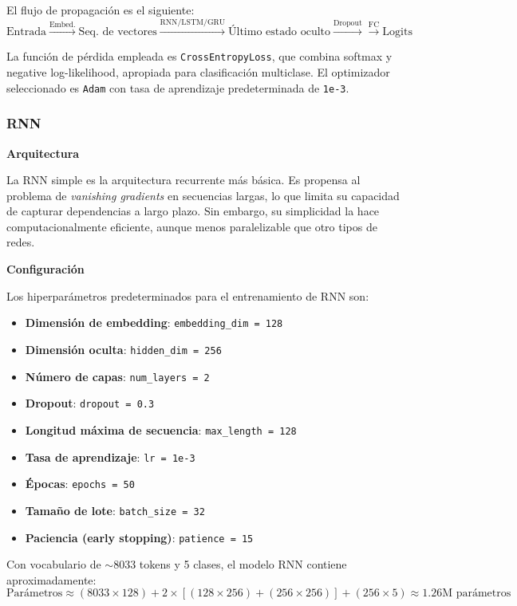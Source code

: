 \documentclass[paper=letter, fontsize=11pt, draft=false]{scrartcl}
\numberwithin{equation}{section} %
\numberwithin{figure}{section} %
\numberwithin{table}{section} %
\numberwithin{subsection}{section}
\begin{document}
El flujo de propagación es el siguiente:
\[
\text{Entrada} \xrightarrow{\text{Embed.}} \text{Seq. de vectores} \xrightarrow{\text{RNN/LSTM/GRU}} \text{Último estado oculto} \xrightarrow{\text{Dropout}} \xrightarrow{\text{FC}} \text{Logits}
\]

La función de pérdida empleada es \texttt{CrossEntropyLoss}, que combina softmax y negative log-likelihood, apropiada para clasificación multiclase. El optimizador seleccionado es \texttt{Adam} con tasa de aprendizaje predeterminada de \texttt{1e-3}.

\subsubsection{RNN}

\textbf{Arquitectura}

La RNN simple es la arquitectura recurrente más básica. Es propensa al problema de \textit{vanishing gradients} en secuencias largas, lo que limita su capacidad de capturar dependencias a largo plazo. Sin embargo, su simplicidad la hace computacionalmente eficiente, aunque menos paralelizable que otro tipos de redes.

\textbf{Configuración}

Los hiperparámetros predeterminados para el entrenamiento de RNN son:
\begin{itemize}
    \item \textbf{Dimensión de embedding}: \texttt{embedding\_dim = 128}
    \item \textbf{Dimensión oculta}: \texttt{hidden\_dim = 256}
    \item \textbf{Número de capas}: \texttt{num\_layers = 2}
    \item \textbf{Dropout}: \texttt{dropout = 0.3}
    \item \textbf{Longitud máxima de secuencia}: \texttt{max\_length = 128}
    \item \textbf{Tasa de aprendizaje}: \texttt{lr = 1e-3}
    \item \textbf{Épocas}: \texttt{epochs = 50}
    \item \textbf{Tamaño de lote}: \texttt{batch\_size = 32}
    \item \textbf{Paciencia (early stopping)}: \texttt{patience = 15}
\end{itemize}

Con vocabulario de $\sim$8033 tokens y 5 clases, el modelo RNN contiene aproximadamente:
\[
\text{Parámetros} \approx (8033 \times 128) + 2 \times [(128 \times 256) + (256 \times 256)] + (256 \times 5) \approx 1.26 \text{M parámetros}
\]
\end{document}
